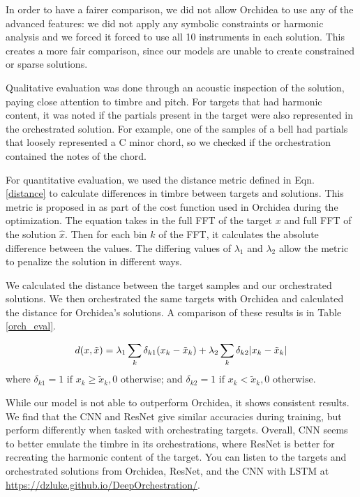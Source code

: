 \documentclass[runningheads,a4paper]{llncs}
\begin{document}
In order to have a fairer comparison, we did not allow Orchidea to use any of the advanced features: we did not apply any symbolic constraints or harmonic analysis and we forced it forced to use all 10 instruments in each solution. This creates a more fair comparison, since our models are unable to create constrained or sparse solutions.

Qualitative evaluation was done through an acoustic inspection of the solution, paying close attention to timbre and pitch. For targets that had harmonic content, it was noted if the partials present in the target were also represented in the orchestrated solution. For example, one of the samples of a bell had partials that loosely represented a C minor chord, so we checked if the orchestration contained the notes of the chord.

For quantitative evaluation, we used the distance metric defined in Eqn. \ref{distance} to calculate differences in timbre between targets and solutions. This metric is proposed in \cite{Cella2020} as part of the cost function used in Orchidea during the optimization. The equation takes in the full FFT of the target $x$ and full FFT of the solution $\hat{x}$. Then for each bin $k$ of the FFT, it calculates the absolute difference between the values. The differing values of $\lambda_1$ and $\lambda_2$ allow the metric to penalize the solution in different ways. 

We calculated the distance between the target samples and our orchestrated solutions. We then orchestrated the same targets with Orchidea and calculated the distance for Orchidea's solutions. A comparison of these results is in Table \ref{orch_eval}.

\begin{equation}\label{distance}
d(x, \tilde{x}) =\lambda_1 \sum_k \delta_{k1}(x_k - \tilde{x}_k) + \lambda_2 \sum_k \delta_{k2}|x_k - \tilde{x	}_k| \\
\end{equation}
where $\delta_{k1} = 1 \text{  if  } x_k \ge \tilde{x}_k, 0 \text{  otherwise}$; and $\delta_{k2} = 1 \text{  if  } x_k < \tilde{x}_k, 0 \text{  otherwise}$.

While our model is not able to outperform Orchidea, it shows consistent results. We find that the CNN and ResNet give similar accuracies during training, but perform differently when tasked with orchestrating targets. Overall, CNN seems to better emulate the timbre in its orchestrations, where ResNet is better for recreating the harmonic content of the target. You can listen to the targets and orchestrated solutions from Orchidea, ResNet, and the CNN with LSTM at \url{https://dzluke.github.io/DeepOrchestration/}.
\end{document}
